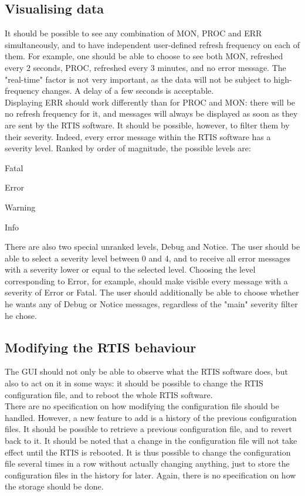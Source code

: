 \documentclass{themeensg}
\begin{document}
\subsection{Visualising data}

It should be possible to see any combination of MON, PROC and ERR simultaneously, and to have independent user-defined refresh frequency on each of them. For example, one should be able to choose to see both MON, refreshed every 2 seconds, PROC, refreshed every 3 minutes, and no error message. The "real-time" factor is not very important, as the data will not be subject to high-frequency changes. A delay of a few seconds is acceptable.\\

Displaying ERR should work differently than for PROC and MON: there will be no refresh frequency for it, and messages will always be displayed as soon as they are sent by the RTIS software. It should be possible, however, to filter them by their severity. Indeed, every error message within the RTIS software has a severity level. Ranked by order of magnitude, the possible levels are: \begin{enumerate*}
  \item Fatal
  \item Error
  \item Warning
  \item Info
\end{enumerate*}
There are also two special unranked levels, Debug and Notice. The user should be able to select a severity level between 0 and 4, and to receive all error messages with a severity lower or equal to the selected level. Choosing the level corresponding to Error, for example, should make visible every message with a severity of Error or Fatal. The user should additionally be able to choose whether he wants any of Debug or Notice messages, regardless of the "main" severity filter he chose.

\subsection{Modifying the RTIS behaviour}

The GUI should not only be able to observe what the RTIS software does, but also to act on it in some ways: it should be possible to change the RTIS configuration file, and to reboot the whole RTIS software.\\

There are no specification on how modifying the configuration file should be handled. However, a new feature to add is a history of the previous configuration files. It should be possible to retrieve a previous configuration file, and to revert back to it. It should be noted that a change in the configuration file will not take effect until the RTIS is rebooted. It is thus possible to change the configuration file several times in a row without actually changing anything, just to store the configuration files in the history for later. Again, there is no specification on how the storage should be done.
\end{document}
